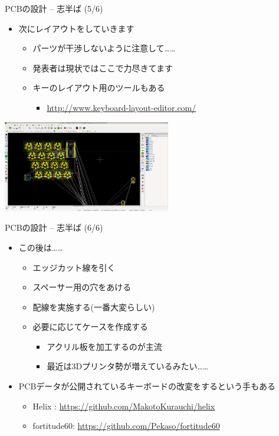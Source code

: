 \documentclass[cjk,dvipdfmx,10pt,compress,fragile%
hyperref={bookmarks=true,bookmarksnumbered=true,bookmarksopen=false,%
colorlinks=false,%
pdftitle={第 134 回 関西 Debian 勉強会},%
pdfauthor={小林},%
pdfsubject={資料},%
}]{beamer}
\begin{document}
\begin{frame}[fragile,t]{PCBの設計 -- 志半ば (5/6)}
 \begin{itemize}
  \item 次にレイアウトをしていきます
	\begin{itemize}
	 \item パーツが干渉しないように注意して……
	 \item 発表者は現状ではここで力尽きてます
	 \item キーのレイアウト用のツールもある
	       \begin{itemize}
		\item \url{http://www.keyboard-layout-editor.com/}
	       \end{itemize}
	\end{itemize}
 \end{itemize}
 \begin{center}
  \includegraphics[keepaspectratio,height=4cm]{./img/kicad-layout.png}
 \end{center}
\end{frame}

\begin{frame}[fragile,t]{PCBの設計 -- 志半ば (6/6)}
 \begin{itemize}
  \item この後は……
	\begin{itemize}
	 \item エッジカット線を引く
	 \item スペーサー用の穴をあける
	 \item 配線を実施する(一番大変らしい)
	 \item 必要に応じてケースを作成する
	       \begin{itemize}
		\item アクリル板を加工するのが主流
		\item 最近は3Dプリンタ勢が増えているみたい……
	       \end{itemize}
	\end{itemize}
  \item PCBデータが公開されているキーボードの改変をするという手もある
	\begin{itemize}
	 \item Helix : \url{https://github.com/MakotoKurauchi/helix}
	 \item fortitude60: \url{https://github.com/Pekaso/fortitude60}
	\end{itemize}
 \end{itemize}
\end{frame}
\end{document}
